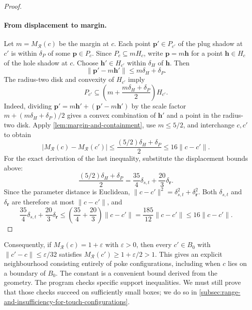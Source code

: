 \begin{proof}
  \paragraph{From displacement to margin.}
  Let $m=M_{\mathcal R}(c)$ be the margin at $c$. Each point
  $\mathbf p'\in P_{c'}$ of the plug shadow at $c'$ is within
  $\delta_P$ of some $\mathbf p\in P_c$. Since $P_c\subseteq mH_c$,
  write $\mathbf p=m\mathbf h$ for a point $\mathbf h\in H_c$ of the
  hole shadow at $c$. Choose $\mathbf h'\in H_{c'}$ within
  $\delta_H$ of $\mathbf h$. Then
  \[
    \lVert\mathbf p'-m\mathbf h'\rVert\le m\delta_H+\delta_P.
  \]
  The radius-two disk and convexity of $H_{c'}$ imply
  \[
    P_{c'}\subseteq
    \left(m+\frac{m\delta_H+\delta_P}{2}\right)H_{c'}.
  \]
  Indeed, dividing
  $\mathbf p'=m\mathbf h'+(\mathbf p'-m\mathbf h')$ by the scale factor
  $m+(m\delta_H+\delta_P)/2$ gives a convex combination of
  $\mathbf h'$ and a point in the radius-two disk.
  Apply \cref{lem:margin-and-containment}, use $m\le5/2$, and interchange
  $c,c'$ to obtain
  \begin{equation}\label{eq:margin-from-shadow-displacement}
    |M_{\mathcal R}(c)-M_{\mathcal R}(c')|
      \le\frac{(5/2)\delta_H+\delta_P}{2}
      \le16\lVert c-c'\rVert.
  \end{equation}
  For the exact derivation of the last inequality, substitute the
  displacement bounds above:
  \[
    \frac{(5/2)\delta_H+\delta_P}{2}
      =\frac{35}{4}\delta_{s,t}+\frac{20}{3}\delta_{\mathbf r}.
  \]
  Since the parameter distance is Euclidean,
  $\lVert c-c'\rVert^2=\delta_{s,t}^2+\delta_{\mathbf r}^2$.
  Both $\delta_{s,t}$ and $\delta_{\mathbf r}$ are therefore at most
  $\lVert c-c'\rVert$, and
  \[
    \frac{35}{4}\delta_{s,t}+\frac{20}{3}\delta_{\mathbf r}
      \le\left(\frac{35}{4}+\frac{20}{3}\right)\lVert c-c'\rVert
      =\frac{185}{12}\lVert c-c'\rVert
      \le16\lVert c-c'\rVert.
  \]
\end{proof}

Consequently, if $M_{\mathcal R}(c)=1+\varepsilon$ with $\varepsilon>0$,
then every $c'\in B_0$ with $\lVert c'-c\rVert\le\varepsilon/32$ satisfies
$M_{\mathcal R}(c')\ge1+\varepsilon/2>1$. This gives an explicit neighbourhood consisting entirely of poke
configurations, including when $c$ lies on a boundary of $B_0$.
The constant is a convenient bound derived from the geometry.
The program checks specific support inequalities. We must still prove that those checks
succeed on sufficiently small boxes; we do so in
\cref{subsec:range-and-insufficiency-for-touch-configurations}.

